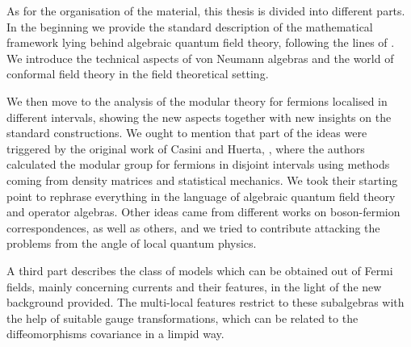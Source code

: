  \bigskip 
 As for the  
 organisation of the material, this thesis is divided into 
 different parts. In the beginning we provide the standard 
 description of the mathematical framework lying behind 
 algebraic quantum field theory, following the lines of 
 \cite{Haag}. We introduce the technical aspects of 
 von Neumann algebras and the world of conformal field 
 theory in the field theoretical setting. 
 
 We then move to the analysis of the modular theory for 
 fermions localised in different intervals, 
 showing the new
 aspects together with new insights on the standard 
 constructions. We ought to mention that part of the 
 ideas were triggered by the original work of 
 Casini and Huerta, \cite{CH:2009}, where the authors 
 calculated the modular group for fermions in disjoint 
 intervals using methods coming from density matrices 
 and statistical mechanics. We took their starting point 
 to rephrase everything in the language of algebraic quantum 
 field theory and operator algebras. Other ideas came from
 different works on boson-fermion correspondences, 
 \cite{Ang:2011} as well as others, and we
 tried to contribute attacking the problems from the 
 angle of local quantum physics.
 
 A third part describes the class of models which can 
 be obtained out of Fermi fields, mainly concerning
 currents and their features, in the light of the 
 new background provided. The multi-local features 
 restrict to these subalgebras with the help of suitable 
 gauge transformations, which can be related to the 
 diffeomorphisms covariance in a limpid way.
 
  
\endgroup			
